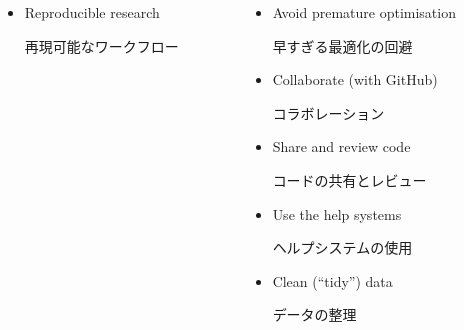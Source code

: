 \documentclass{beamer}
\begin{document}
\begin{frame}
\begin{columns}[T]
\begin{column}[T]{6cm}
\begin{itemize}
   \item Reproducible research \\ \begin{CJK}{UTF8}{min}再現可能なワークフロー\end{CJK}
   
  \end{itemize}
  \end{column} \begin{column}[T]{6cm} %
    
  \begin{itemize}
  \item Avoid premature optimisation \\ \begin{CJK}{UTF8}{min}早すぎる最適化の回避\end{CJK}
      \smallskip
   
   \item Collaborate (with GitHub) \\ \begin{CJK}{UTF8}{min}コラボレーション\end{CJK}
      \smallskip
   
   \item Share and review code \\ \begin{CJK}{UTF8}{min}コードの共有とレビュー\end{CJK}
      \smallskip
   
   \item Use the help systems \\ \begin{CJK}{UTF8}{min}ヘルプシステムの使用\end{CJK}
      \smallskip
   
   \item Clean (``tidy'') data \\ \begin{CJK}{UTF8}{min}データの整理\end{CJK}
   
  \end{itemize}  
  
   \end{column}
     \end{columns}  
  \end{frame}
  
  \begin{frame}

\begin{center}
  \end{center}

\end{frame}
\end{document}

